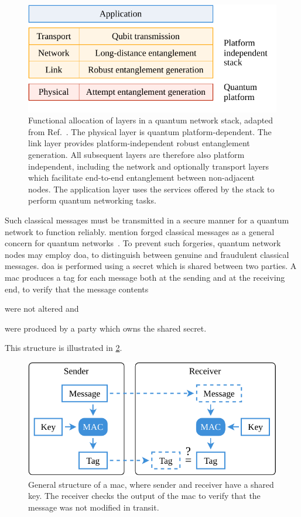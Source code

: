 \begin{figure}[b]
    \centering
    \includegraphics[width=0.6\linewidth]{figures/functional-allocation.pdf}
    \caption{
        Functional allocation of layers in a quantum network stack, adapted from
        Ref.~\cite{dahlberg_2019_egp}. The physical layer is quantum platform-dependent. The link
        layer provides platform-independent robust entanglement generation. All subsequent layers
        are therefore also platform independent, including the network and optionally transport
        layers which facilitate end-to-end entanglement between non-adjacent nodes. The application
        layer uses the services offered by the stack to perform quantum networking tasks.
    }
    \label{fig:functional-allocation}
\end{figure}

Such classical messages must be transmitted in a secure manner for a quantum network to function
reliably. \citeauthor{satoh_2020_attacking} mention forged classical messages as a general concern
for quantum networks~\cite{satoh_2020_attacking}. To prevent such forgeries, quantum network nodes
may employ \acrfull{doa}, to distinguish between genuine and fraudulent classical messages.
\acrshort{doa} is performed using a secret which is shared between two parties. A \acrfull{mac}
produces a tag for each message both at the sending and at the receiving end, to verify that the
message contents
%
\begin{inlinelist}
    \item were not altered and
    \item were produced by a party which owns the shared secret.
\end{inlinelist}
%
This structure is illustrated in \cref{fig:mac-structure}.

\begin{figure}[t]
    \centering
    \includegraphics[width=0.6\linewidth]{figures/mac-structure.pdf}
    \caption{
        General structure of a \acrfull{mac}, where sender and receiver have a shared key. The
        receiver checks the output of the \acrshort{mac} to verify that the message was not modified
        in transit.
    }
    \label{fig:mac-structure}
\end{figure}

